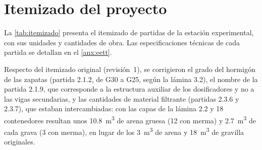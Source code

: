 \chapter{Itemizado del proyecto}
\label{anx:itemizado}

La \cref{tab:itemizado} presenta el itemizado de partidas de la estación experimental, con sus unidades y cantidades de obra.
Las especificaciones técnicas de cada partida se detallan en el \cref{anx:eett}.

Respecto del itemizado original (revisión~1), se corrigieron el grado del hormigón de las zapatas (partida 2.1.2, de G30 a G25, según la lámina 3.2), el nombre de la partida 2.1.9, que corresponde a la estructura auxiliar de los dosificadores y no a las vigas secundarias, y las cantidades de material filtrante (partidas 2.3.6 y 2.3.7), que estaban intercambiadas: con las capas de la lámina 2.2 y 18 contenedores resultan unos \qty{10.8}{\cubic\meter} de arena gruesa (12 con merma) y \qty{2.7}{\cubic\meter} de cada grava (3 con merma), en lugar de los \qty{3}{\cubic\meter} de arena y \qty{18}{\cubic\meter} de gravilla originales.


{\small{}

}
